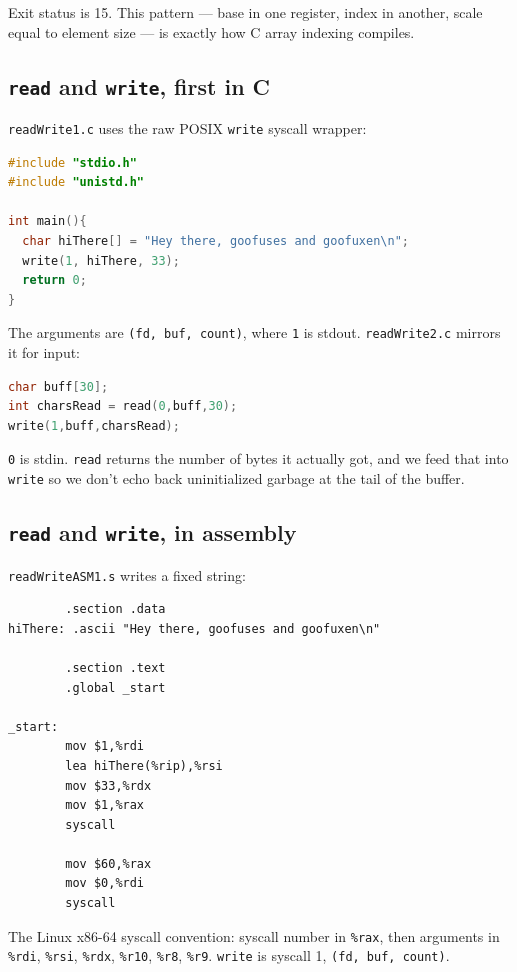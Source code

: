 \documentclass[11pt]{article}
\begin{document}
Exit status is 15. This pattern --- base in one register, index in
another, scale equal to element size --- is exactly how C array
indexing compiles.

\subsection*{\texttt{read} and \texttt{write}, first in C}

\texttt{readWrite1.c} uses the raw POSIX \texttt{write} syscall
wrapper:

\begin{lstlisting}[language=C]
#include "stdio.h"
#include "unistd.h"

int main(){
  char hiThere[] = "Hey there, goofuses and goofuxen\n";
  write(1, hiThere, 33);
  return 0;
}
\end{lstlisting}

The arguments are \texttt{(fd, buf, count)}, where \texttt{1} is
stdout. \texttt{readWrite2.c} mirrors it for input:

\begin{lstlisting}[language=C]
char buff[30];
int charsRead = read(0,buff,30);
write(1,buff,charsRead);
\end{lstlisting}

\texttt{0} is stdin. \texttt{read} returns the number of bytes it
actually got, and we feed that into \texttt{write} so we don't
echo back uninitialized garbage at the tail of the buffer.

\subsection*{\texttt{read} and \texttt{write}, in assembly}

\texttt{readWriteASM1.s} writes a fixed string:

\begin{lstlisting}
        .section .data
hiThere: .ascii "Hey there, goofuses and goofuxen\n"

        .section .text
        .global _start

_start:
        mov $1,%rdi
        lea hiThere(%rip),%rsi
        mov $33,%rdx
        mov $1,%rax
        syscall

        mov $60,%rax
        mov $0,%rdi
        syscall
\end{lstlisting}

The Linux x86-64 syscall convention: syscall number in
\texttt{\%rax}, then arguments in \texttt{\%rdi}, \texttt{\%rsi},
\texttt{\%rdx}, \texttt{\%r10}, \texttt{\%r8}, \texttt{\%r9}.
\texttt{write} is syscall 1, \texttt{(fd, buf, count)}.
\end{document}
